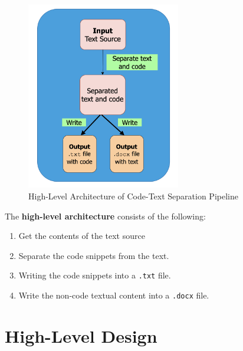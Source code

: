 \documentclass[12pt]{scrreprt}
\begin{document}
\begin{figure}[h]
    \centering
    \includegraphics[width=0.6\textwidth]{figures/NB-high-arch.png}
    \caption{High-Level Architecture of Code-Text Separation Pipeline}
    \label{fig:high-level-arch}
\end{figure}


The \textbf{high-level architecture} consists of the following:
\begin{enumerate}
    \item Get the contents of the text source
    \item Separate the code snippets from the text.
    \item Writing the code snippets into a \texttt{.txt} file.
    \item Write the non-code textual content into a \texttt{.docx} file.
\end{enumerate}


\newpage 


\section{High-Level Design}
\end{document}
